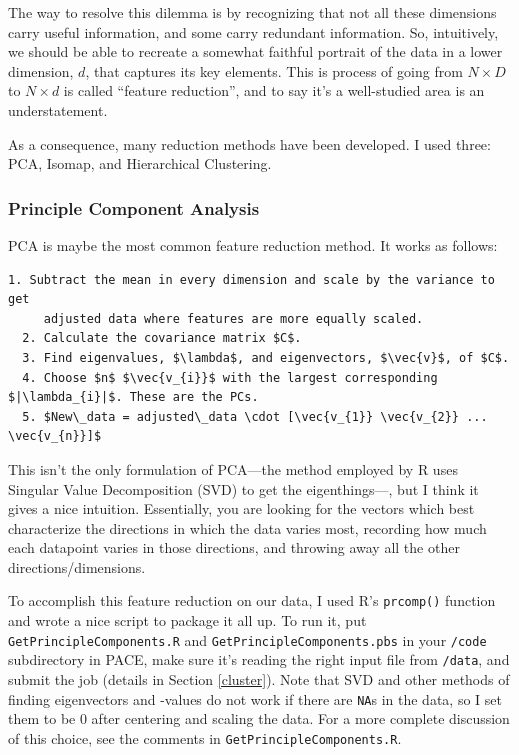\documentclass[]{article}
\begin{document}
  The way to resolve this dilemma is by recognizing that not all these dimensions carry useful information, and some carry redundant information. So, intuitively, we should be able to recreate a somewhat faithful portrait of the data in a lower dimension, $d$, that captures its key elements. This is process of going from $N \times D$ to $N \times d$ is called ``feature reduction'', and to say it's a well-studied area is an understatement.

  As a consequence, many reduction methods have been developed. I used three: PCA, Isomap, and Hierarchical Clustering.

  \subsubsection{Principle Component Analysis}

  PCA is maybe the most common feature reduction method. It works as follows:

  \begin{lstlisting}[mathescape]
  1. Subtract the mean in every dimension and scale by the variance to get 
     adjusted data where features are more equally scaled.
  2. Calculate the covariance matrix $C$.
  3. Find eigenvalues, $\lambda$, and eigenvectors, $\vec{v}$, of $C$.
  4. Choose $n$ $\vec{v_{i}}$ with the largest corresponding $|\lambda_{i}|$. These are the PCs.
  5. $New\_data = adjusted\_data \cdot [\vec{v_{1}} \vec{v_{2}} ... \vec{v_{n}}]$
  \end{lstlisting}

  This isn't the only formulation of PCA---the method employed by R uses Singular Value Decomposition (SVD) to get the eigenthings---, but I think it gives a nice intuition. Essentially, you are looking for the vectors which best characterize the directions in which the data varies most, recording how much each datapoint varies in those directions, and throwing away all the other directions/dimensions.

  To accomplish this feature reduction on our data, I used R's \texttt{prcomp()} function and wrote a nice script to package it all up. To run it, put \texttt{GetPrincipleComponents.R} and \texttt{GetPrincipleComponents.pbs} in your \texttt{/code} subdirectory in PACE, make sure it's reading the right input file from \texttt{/data}, and submit the job (details in Section \ref{cluster}). Note that SVD and other methods of finding eigenvectors and -values do not work if there are \texttt{NA}s in the data, so I set them to be $0$ after centering and scaling the data. For a more complete discussion of this choice, see the comments in \texttt{GetPrincipleComponents.R}.
\end{document}
